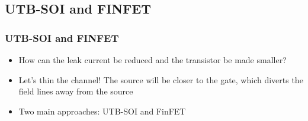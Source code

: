 \documentclass{beamer}
\begin{document}
\subsection{UTB-SOI and FINFET}
\begin{frame}\frametitle{UTB-SOI and FINFET} 
\begin{itemize}
 \item How can the leak current be reduced and the transistor be made smaller?\pause
 
 \item Let's thin the channel! The source will be closer to the gate, which diverts the field lines away from the source\pause
 
 \item Two main approaches: UTB-SOI and FinFET
\end{itemize}
\end{frame}
\end{document}
